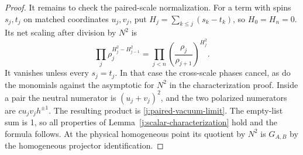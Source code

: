 \begin{proof}
It remains to check the paired-scale normalization. For a term with
spins $s_j,t_j$ on matched coordinates $u_j,v_j$, put
$H_j=\sum_{k\le j}(s_k-t_k)$, so $H_0=H_n=0$. Its net scaling after
division by $N^2$ is
\[
\prod_j\rho_j^{H_j^2-H_{j-1}^2}
 =\prod_{j<n}\left(\frac{\rho_j}{\rho_{j+1}}\right)^{H_j^2}.
\]
It vanishes unless every $s_j=t_j$. In that case the cross-scale
phases cancel, as do the monomials against the asymptotic for $N^2$
in the characterization proof. Inside a pair the neutral numerator
is $(u_j+v_j)^2$, and the two polarized numerators are
$c u_jv_j h^{\pm1}$. The resulting product is
\eqref{j:paired-vacuum-limit}. The empty-list sum is 1, so all properties
of Lemma~\ref{j:scalar-characterization} hold and the formula follows.
At the physical homogeneous point its quotient by $N^2$ is
$G_{A,B}$ by the homogeneous projector identification.
\end{proof}
